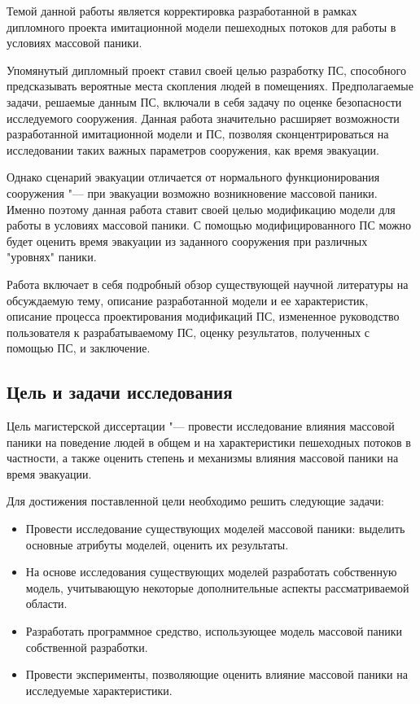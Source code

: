 
Темой данной работы является корректировка разработанной в рамках дипломного проекта имитационной модели пешеходных потоков для работы в условиях массовой паники.

Упомянутый дипломный проект ставил своей целью разработку ПС, способного предсказывать вероятные места скопления людей в помещениях.
Предполагаемые задачи, решаемые данным ПС, включали в себя задачу по оценке безопасности исследуемого сооружения.
Данная работа значительно расширяет возможности разработанной имитационной модели и ПС, позволяя сконцентрироваться на исследовании таких важных параметров сооружения, как время эвакуации.

Однако сценарий эвакуации отличается от нормального функционирования сооружения "--- при эвакуации возможно возникновение массовой паники.
Именно поэтому данная работа ставит своей целью модификацию модели для работы в условиях массовой паники.
С помощью модифицированного ПС можно будет оценить время эвакуации из заданного сооружения при различных "уровнях" паники.

Работа включает в себя подробный обзор существующей научной литературы на обсуждаемую тему, описание разработанной модели и ее характеристик,
описание процесса проектирования модификаций ПС, измененное руководство пользователя к разрабатываемому ПС, оценку результатов, полученных с помощью ПС,
и заключение.


\label{sec:general_characteristics}

\subsection*{\textbf{Цель и задачи исследования}}

Цель магистерской диссертации "--- провести исследование влияния массовой паники на поведение людей в общем
и на характеристики пешеходных потоков в частности, а также оценить степень и механизмы влияния массовой паники
на время эвакуации.

Для достижения поставленной цели необходимо решить следующие задачи:

\begin{itemize}
  \item Провести исследование существующих моделей массовой паники: выделить основные атрибуты моделей, оценить их результаты.
  \item На основе исследования существующих моделей разработать собственную модель, учитывающую некоторые дополнительные аспекты рассматриваемой области.
  \item Разработать программное средство, использующее модель массовой паники собственной разработки.
  \item Провести эксперименты, позволяющие оценить влияние массовой паники на исследуемые характеристики.
\end{itemize}

